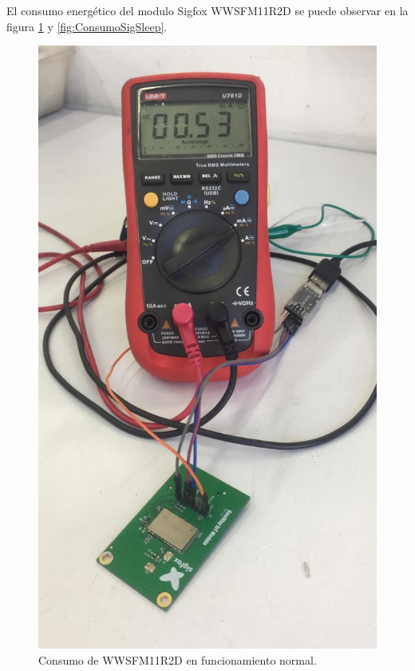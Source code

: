 El consumo energético del modulo Sigfox WWSFM11R2D se puede observar en la figura \ref{fig:Consumo_SigNormal} y \ref{fig:ConsumoSigSleep}. 
\begin{figure}[H]
	\centering
	\includegraphics[scale=.15]{./Figures/Consumo_SigNormal.jpeg}
	\caption{Consumo de WWSFM11R2D en funcionamiento normal.}
	\label{fig:Consumo_SigNormal}
\end{figure}

